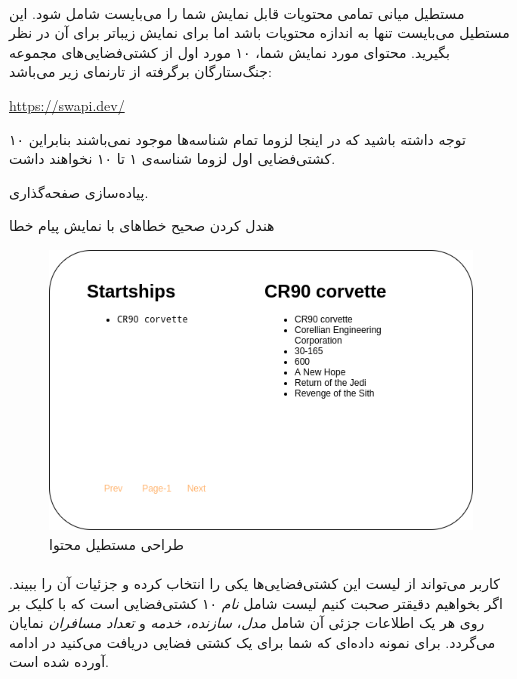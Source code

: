 \documentclass[../main.tex]{subfiles}
\begin{document}
\paragraph{}
مستطیل میانی تمامی محتویات قابل نمایش شما را می‌بایست شامل شود. این مستطیل می‌بایست تنها به اندازه محتویات باشد اما برای نمایش زیباتر برای آن  در نظر بگیرید.
محتوای مورد نمایش شما، ۱۰ مورد اول از کشتی‌فضایی‌های مجموعه جنگ‌ستارگان برگرفته از تارنمای زیر می‌باشد:

\begin{latin}
  \url{https://swapi.dev/}
\end{latin}

توجه داشته باشید که در اینجا لزوما تمام شناسه‌ها موجود نمی‌باشند بنابراین ۱۰ کشتی‌فضایی اول لزوما شناسه‌ی ۱ تا ۱۰ نخواهند داشت.

\Extra پیاده‌سازی صفحه‌گذاری.

\Extra هندل کردن صحیح خطاهای  با نمایش پیام خطا

\begin{figure}[h]
  \centering
  \includegraphics[scale=0.25]{./swapi-content}
  \caption{طراحی مستطیل محتوا}
\end{figure}

\paragraph{}
کاربر می‌تواند از لیست این کشتی‌فضایی‌ها یکی را انتخاب کرده و جزئیات آن را ببیند. اگر بخواهیم دقیقتر صحبت کنیم لیست شامل \textit{نام} ۱۰ کشتی‌فضایی است که با کلیک بر روی هر یک اطلاعات جزئی آن شامل \textit{مدل}، \textit{سازنده}، \textit{خدمه} و \textit{تعداد مسافران} نمایان می‌گردد.
برای نمونه داده‌ای که شما برای یک کشتی فضایی دریافت می‌کنید در ادامه آورده شده است.
\end{document}
